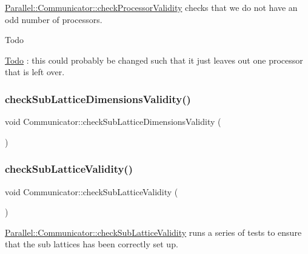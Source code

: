 \mbox{\hyperlink{class_parallel_1_1_communicator_acd7e2f114728e5207093743a58ab3a40}{Parallel\+::\+Communicator\+::check\+Processor\+Validity}} checks that we do not have an odd number of processors. 

\begin{DoxyRefDesc}{Todo}
\item[\mbox{\hyperlink{todo__todo000005}{Todo}}]\+: this could probably be changed such that it just leaves out one processor that is left over. \end{DoxyRefDesc}
\mbox{\label{class_parallel_1_1_communicator_a535fddf3fe091b82f8ca3de7974f7412}} 
\subsubsection{\texorpdfstring{checkSubLatticeDimensionsValidity()}{checkSubLatticeDimensionsValidity()}}
{\footnotesize\ttfamily void Communicator\+::check\+Sub\+Lattice\+Dimensions\+Validity (\begin{DoxyParamCaption}{ }\end{DoxyParamCaption})\hspace{0.3cm}{\ttfamily [static]}}

\mbox{\label{class_parallel_1_1_communicator_a5da7239eefebcebbeeabee499b2d724d}} 
\subsubsection{\texorpdfstring{checkSubLatticeValidity()}{checkSubLatticeValidity()}}
{\footnotesize\ttfamily void Communicator\+::check\+Sub\+Lattice\+Validity (\begin{DoxyParamCaption}{ }\end{DoxyParamCaption})\hspace{0.3cm}{\ttfamily [static]}}



\mbox{\hyperlink{class_parallel_1_1_communicator_a5da7239eefebcebbeeabee499b2d724d}{Parallel\+::\+Communicator\+::check\+Sub\+Lattice\+Validity}} runs a series of tests to ensure that the sub lattices has been correctly set up. 

